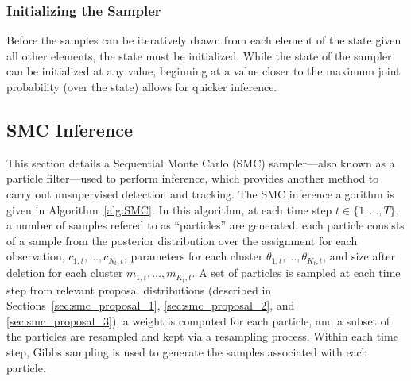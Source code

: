 \documentclass[smallcondensed, final]{svjour3}
\begin{document}

\subsubsection{Initializing the Sampler}
Before the samples can be iteratively drawn from each element of the state given all other elements, the state must be initialized. While the state of the sampler can be initialized at any value, beginning at a value closer to the maximum joint probability (over the state) allows for quicker inference.






\subsection{SMC Inference}
\label{sec:SMC}

This section details a Sequential Monte Carlo (SMC) sampler---also known as a particle filter---used to perform inference, which provides another method to carry out unsupervised detection and tracking. The SMC inference algorithm is given in Algorithm~\ref{alg:SMC}. In this algorithm, at each time step $t \in \{ 1, \ldots, T \}$, a number of samples refered to as ``particles'' are generated; each particle consists of a sample from the posterior distribution over the assignment for each observation, $c_{1,t}, \ldots, c_{N_{t}, t}$, parameters for each cluster $\theta_{1,t}, \ldots, \theta_{K_{t}, t}$, and size after deletion for each cluster $m_{1,t}, \ldots, m_{K_{t},t}$. A set of particles is sampled at each time step from relevant proposal distributions (described in Sections~\ref{sec:smc_proposal_1}, \ref{sec:smc_proposal_2}, and \ref{sec:smc_proposal_3}), a weight is computed for each particle, and a subset of the particles are resampled and kept via a resampling process. Within each time step, Gibbs sampling is used to generate the samples associated with each particle.
\end{document}
